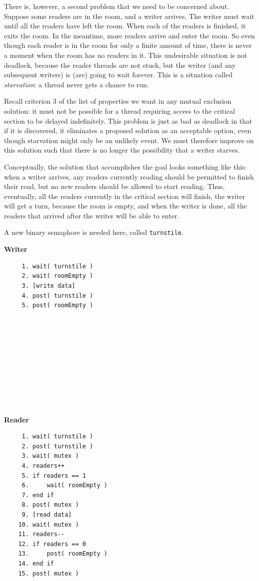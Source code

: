 \documentclass[a4paper]{report}
\begin{document}
There is, however, a second problem that we need to be concerned about. Suppose some readers are in the room, and a writer arrives. The writer must wait until all the readers have left the room. When each of the readers is finished, it exits the room. In the meantime, more readers arrive and enter the room. So even though each reader is in the room for only a finite amount of time, there is never a moment when the room has no readers in it. This undesirable situation is not deadlock, because the reader threads are not stuck, but the writer (and any subsequent writers) is (are) going to wait forever. This is a situation called \textit{starvation}: a thread never gets a chance to run.

Recall criterion 3 of the list of properties we want in any mutual exclusion solution: it must not be possible for a thread requiring access to the critical section to be delayed indefinitely. This problem is just as bad as deadlock in that if it is discovered, it eliminates a proposed solution as an acceptable option, even though starvation might only be an unlikely event. We must therefore improve on this solution such that there is no longer the possibility that a writer starves.

Conceptually, the solution that accomplishes the goal looks something like this: when a writer arrives, any readers currently reading should be permitted to finish their read, but no new readers should be allowed to start reading. Thus, eventually, all the readers currently in the critical section will finish, the writer will get a turn, because the room is empty, and when the writer is done, all the readers that arrived after the writer will be able to enter.

A new binary semaphore is needed here, called \texttt{turnstile}.

\begin{multicols}{2}
	\textbf{Writer}\vspace{-2em}
	\begin{verbatim}
	 1. wait( turnstile )
	 2. wait( roomEmpty )
	 3. [write data]
	 4. post( turnstile )
	 5. post( roomEmpty )
	 
	 
	 
	 
	 
	 
	 
	 
	 
	 
  \end{verbatim}
	\columnbreak
	\textbf{Reader}\vspace{-2em}
	\begin{verbatim}
	 1. wait( turnstile )
	 2. post( turnstile )
	 3. wait( mutex )
	 4. readers++
	 5. if readers == 1
	 6.     wait( roomEmpty )
	 7. end if
	 8. post( mutex )
	 9. [read data]
	10. wait( mutex )
	11. readers--
	12. if readers == 0
	13.     post( roomEmpty )
	14. end if
	15. post( mutex )
  \end{verbatim}
\end{multicols}
\vspace{-2em}
\end{document}
